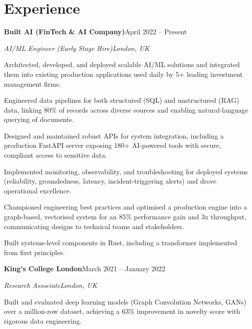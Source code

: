 \documentclass[10pt,a4paper]{article}
\newcommand{\entry}[4]{%
  {\color{company}\bfseries #1}\hfill {\color{muted}#2}\par
  \vspace{1pt}
  {\itshape #3}\hfill {\color{muted}\itshape #4}\par
  \vspace{3pt}%
}
\begin{document}
\section{Experience}
\entry{Built AI (FinTech \& AI Company)}{April 2022 -- Present}{AI/ML Engineer (Early Stage Hire)}{London, UK}
\begin{tight}
  \item Architected, developed, and deployed scalable AI/ML solutions and integrated them into existing production applications used daily by 5+ leading investment management firms.
  \item Engineered data pipelines for both structured (SQL) and unstructured (RAG) data, linking 80\% of records across diverse sources and enabling natural-language querying of documents.
  \item Designed and maintained robust APIs for system integration, including a production FastAPI server exposing 180+ AI-powered tools with secure, compliant access to sensitive data.
  \item Implemented monitoring, observability, and troubleshooting for deployed systems (reliability, groundedness, latency, incident-triggering alerts) and drove operational excellence.
  \item Championed engineering best practices and optimised a production engine into a graph-based, vectorised system for an 85\% performance gain and 3x throughput, communicating designs to technical teams and stakeholders.
  \item Built systems-level components in Rust, including a transformer implemented from first principles.
\end{tight}

\entry{King's College London}{March 2021 -- January 2022}{Research Associate}{London, UK}
\begin{tight}
  \item Built and evaluated deep learning models (Graph Convolution Networks, GANs) over a million-row dataset, achieving a 63\% improvement in novelty score with rigorous data engineering.
\end{tight}

\end{document}
